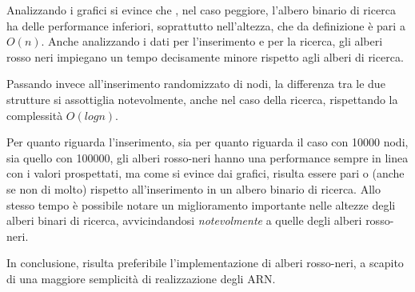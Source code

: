 \documentclass[
]{article}
\begin{document}
Analizzando i grafici si evince che , nel caso peggiore, l’albero binario 
di ricerca ha delle performance inferiori, soprattutto nell’altezza, che da
definizione è pari a \({O}(n)\). Anche analizzando i dati per l’inserimento 
e per la ricerca, gli alberi rosso neri impiegano un tempo decisamente minore 
rispetto agli alberi di ricerca.

Passando invece all'inserimento randomizzato di nodi, la differenza tra le due
strutture si assottiglia notevolmente, anche nel caso della ricerca,
rispettando la complessità \({O}(logn)\). 

Per quanto riguarda l'inserimento, sia per quanto riguarda il caso con 10000 nodi, sia
quello con 100000, gli alberi rosso-neri hanno una performance sempre in
linea con i valori prospettati, ma come si evince dai grafici, risulta essere pari
o (anche se non di molto) rispetto all'inserimento in un albero binario di ricerca.
Allo stesso tempo è possibile notare un miglioramento importante nelle altezze degli alberi binari
di ricerca, avvicindandosi \emph{notevolmente} a quelle degli alberi
rosso-neri.

In conclusione, risulta preferibile l'implementazione di alberi
rosso-neri, a scapito di una maggiore semplicità di realizzazione degli
ARN.
\end{document}
